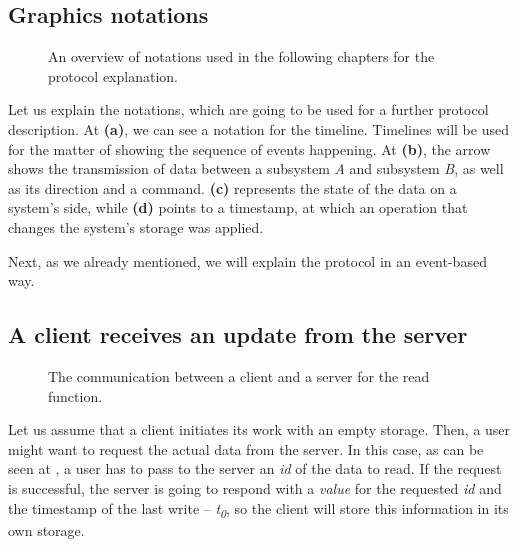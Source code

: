\subsection*{Graphics notations}

\begin{figure}[!htb]
    \centering
    \def\svgwidth{0.35\linewidth}
    \subfloat[]{{}}%
    \qquad
    \def\svgwidth{0.35\linewidth}
    \subfloat[]{{}}%
 \def\svgwidth{0.35\linewidth}
    \subfloat[]{{}}%
    \qquad
 \def\svgwidth{0.35\linewidth}
    \subfloat[]{{}}%
    \qquad
    \caption{An overview of notations used in the following chapters for the protocol explanation.}%
    \label{fig:notations}%
\end{figure}

Let us explain the notations, which are going to be used for a further protocol description. At  \textbf{(a)}, we can see a notation for the timeline. Timelines will be used for the matter of showing the sequence of events happening. At  \textbf{(b)}, the arrow shows the transmission of data between a subsystem \textit{A} and subsystem \textit{B}, as well as its direction and a command.  \textbf{(c)} represents the state of the data on a system's side, while  \textbf{(d)} points to a timestamp, at which an operation that changes the system's storage was applied.

Next, as we already mentioned, we will explain the protocol in an event-based way. 

\subsection*{A client receives an update from the server}

\begin{figure}[!htb]
    \begin{center}
    \def\svgwidth{\linewidth}
    
    \caption {The communication between a client and a server for the read function.}
    \label{fig:design2}
\end{center}
\end{figure}

Let us assume that a client initiates its work with an empty storage. Then, a user might want to request the actual data from the server. In this case, as can be seen at , a user has to pass to the server an \textit{id} of the data to read. If the request is successful, the server is going to respond with a \textit{value} for the requested \textit{id} and the timestamp of the last write -- \textit{t\textsubscript{0}}, so the client will store this information in its own storage.

